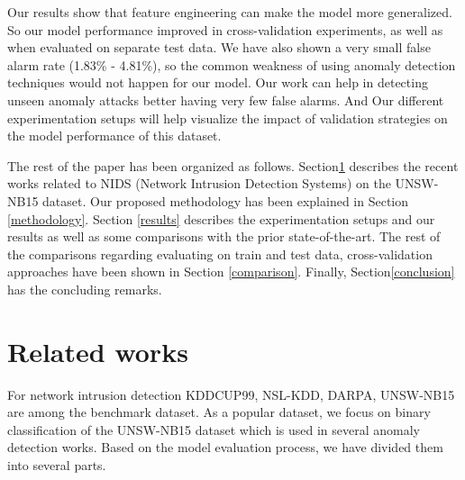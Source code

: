 \documentclass[14pt, conference]{IEEEtran}
\begin{document}
Our results show that feature engineering can make the model more generalized. So our model performance improved in cross-validation experiments, as well as when evaluated on separate test data. We have also shown a very small false alarm rate (1.83\% - 4.81\%), so the common weakness of using anomaly detection techniques would not happen for our model. 
Our work can help in detecting unseen anomaly attacks better having very few false alarms. And Our different experimentation setups will help visualize the impact of validation strategies on the model performance of this dataset.


The rest of the paper has been organized as follows. Section\ref{relatedWorks} describes the recent works related to NIDS (Network Intrusion Detection Systems) on the UNSW-NB15 dataset. Our proposed methodology has been explained in
Section \ref{methodology}. Section \ref{results} describes the experimentation setups and our results as well as some comparisons with the prior state-of-the-art. 
The rest of the comparisons regarding evaluating on train and test data, cross-validation approaches have been shown in Section
\ref{comparison}. Finally, Section\ref{conclusion} has the concluding remarks.



\section{Related works} 
\label{relatedWorks}

For network intrusion detection KDDCUP99, NSL-KDD, DARPA, UNSW-NB15 are among the benchmark dataset. As a popular dataset, we focus on binary classification of the UNSW-NB15 dataset \cite{moustafa2015unsw}  which is used in several anomaly detection works. Based on the model evaluation process, we have divided them into several parts.
\end{document}
